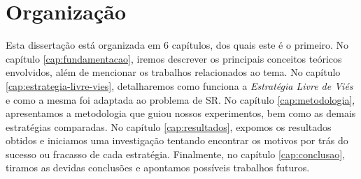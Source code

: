 \section{Organização}

Esta dissertação está organizada em 6 capítulos, dos quais este é o primeiro. No capítulo \ref{cap:fundamentacao}, iremos descrever os principais conceitos teóricos envolvidos, além de mencionar os trabalhos relacionados ao tema. No capítulo \ref{cap:estrategia-livre-vies}, detalharemos como funciona a \textit{Estratégia Livre de Viés} e como a mesma foi adaptada ao problema de SR. No capítulo \ref{cap:metodologia}, apresentamos a metodologia que guiou nossos experimentos, bem como as demais estratégias comparadas. No capítulo \ref{cap:resultados}, expomos os resultados obtidos e iniciamos uma investigação tentando encontrar os motivos por trás do sucesso ou fracasso de cada estratégia. Finalmente, no capítulo \ref{cap:conclusao}, tiramos as devidas conclusões e apontamos possíveis trabalhos futuros.